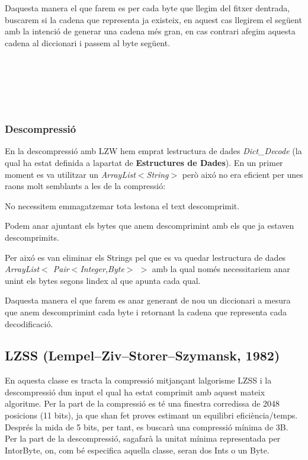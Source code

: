 D\textquotesingle{}aquesta manera el que farem es per cada byte que llegim del fitxer d\textquotesingle{}entrada, buscarem si la cadena que representa ja existeix, en aquest cas llegirem el següent amb la intenció de generar una cadena més gran, en cas contrari afegim aquesta cadena al diccionari i passem al byte següent.

~\newline


~\newline


~\newline


\subsubsection*{Descompressió}

En la descompressió amb L\+ZW hem emprat l\textquotesingle{}estructura de dades {\itshape Dict\+\_\+\+Decode} (la qual ha estat definida a l\textquotesingle{}apartat de {\bfseries Estructures de Dades}). En un primer moment es va utilitzar un {\itshape Array\+List$<$\+String$>$} però aixó no era eficient per unes raons molt semblants a les de la compressió\+:
\begin{DoxyItemize}
\item No necessitem emmagatzemar tota l\textquotesingle{}estona el text descomprimit.
\item Podem anar ajuntant els bytes que anem descomprimint amb els que ja estaven descomprimits.
\end{DoxyItemize}

Per aixó es van eliminar els Strings pel que es va quedar l\textquotesingle{}estructura de dades {\itshape Array\+List$<$ Pair$<$Integer,Byte$>$ $>$} amb la qual només necessitariem anar unint els bytes segons l\textquotesingle{}index al que apunta cada qual.

D\textquotesingle{}aquesta manera el que farem es anar generant de nou un diccionari a mesura que anem descomprimint cada byte i retornant la cadena que representa cada decodificació.

\subsection*{L\+Z\+SS (Lempel–\+Ziv–\+Storer–\+Szymansk, 1982)}

En aquesta classe es tracta la compressió mitjançant l\textquotesingle{}algorisme L\+Z\+SS i la descompressió d\textquotesingle{}un input el qual ha estat comprimit amb aquest mateix algoritme. Per la part de la compressió es té una finestra corredissa de 2048 posicions (11 bits), ja que s\textquotesingle{}han fet proves estimant un equilibri eficiència/temps. Després la mida de 5 bits, per tant, es buscarà una compressió mínima de 3B. Per la part de la descompressió, s\textquotesingle{}agafarà la unitat mínima representada per Intor\+Byte, on, com bé especifica aquella classe, seran dos Int\textquotesingle{}s o un Byte.

